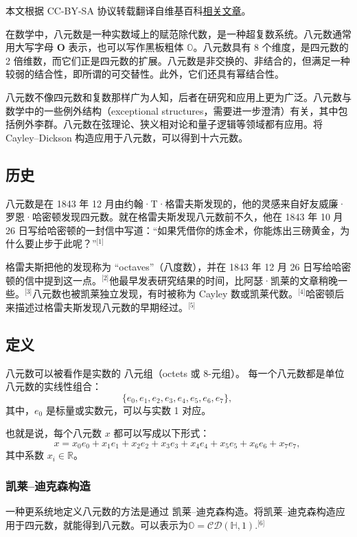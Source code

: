 
本文根据 CC-BY-SA 协议转载翻译自维基百科\href{https://en.wikipedia.org/wiki/Octonion}{相关文章}。

在数学中，八元数是一种实数域上的赋范除代数，是一种超复数系统。八元数通常用大写字母 $\mathbf{O}$ 表示，也可以写作黑板粗体 $\mathbb{O}$。八元数具有 8 个维度，是四元数的 2 倍维数，而它们正是四元数的扩展。八元数是非交换的、非结合的，但满足一种较弱的结合性，即所谓的可交替性。此外，它们还具有幂结合性。

八元数不像四元数和复数那样广为人知，后者在研究和应用上更为广泛。八元数与数学中的一些例外结构（exceptional structures，需要进一步澄清）有关，其中包括例外李群。八元数在弦理论、狭义相对论和量子逻辑等领域都有应用。将 Cayley–Dickson 构造应用于八元数，可以得到十六元数。
\subsection{历史}
八元数是在 1843 年 12 月由约翰·T·格雷夫斯发现的，他的灵感来自好友威廉·罗恩·哈密顿发现四元数。就在格雷夫斯发现八元数前不久，他在 1843 年 10 月 26 日写给哈密顿的一封信中写道：“如果凭借你的炼金术，你能炼出三磅黄金，为什么要止步于此呢？”\(^\text{[1]}\)

格雷夫斯把他的发现称为 “octaves”（八度数），并在 1843 年 12 月 26 日写给哈密顿的信中提到这一点。\(^\text{[2]}\)他最早发表研究结果的时间，比阿瑟·凯莱的文章稍晚一些。\(^\text{[3]}\)八元数也被凯莱独立发现，有时被称为 Cayley 数或凯莱代数。\(^\text{[4]}\)哈密顿后来描述过格雷夫斯发现八元数的早期经过。\(^\text{[5]}\)
\subsection{定义}
八元数可以被看作是实数的 八元组（octets 或 8-元组）。
每一个八元数都是单位八元数的实线性组合：
$$
\{e_{0}, e_{1}, e_{2}, e_{3}, e_{4}, e_{5}, e_{6}, e_{7}\},~
$$
其中，$e_{0}$ 是标量或实数元，可以与实数 1 对应。

也就是说，每个八元数 $x$ 都可以写成以下形式：
$$
x = x_{0} e_{0} + x_{1} e_{1} + x_{2} e_{2} + x_{3} e_{3} 
  + x_{4} e_{4} + x_{5} e_{5} + x_{6} e_{6} + x_{7} e_{7},~
$$
其中系数 $x_{i} \in \mathbb{R}$。
\subsubsection{凯莱–迪克森构造}
一种更系统地定义八元数的方法是通过 凯莱–迪克森构造。将凯莱–迪克森构造应用于四元数，就能得到八元数。可以表示为$\mathbb{O} = \mathcal{CD}(\mathbb{H}, 1)$.\(^\text{[6]}\)

